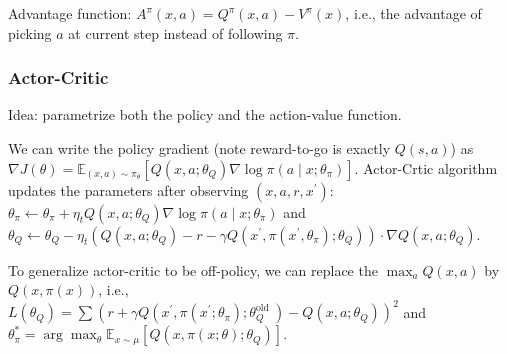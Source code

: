  Advantage function: $A^{\pi}(x, a)=Q^{\pi}(x, a)-V^{\pi}(x)$, i.e., the advantage of picking $a$ at current step instead of following $\pi$.

 \subsubsection*{Actor-Critic}

Idea: parametrize both the policy and the action-value function.

We can write the policy gradient (note reward-to-go is exactly $Q(s,a)$) as $\nabla J(\theta)=\mathbb{E}_{(x, a) \sim \pi_{\theta}}[Q(x, a; \theta_Q) \nabla \log \pi(a \mid x ; \theta_\pi)]$. Actor-Crtic algorithm updates the parameters after observing $(x,a,r,x^\prime)$: $\theta_{\pi} \leftarrow \theta_{\pi}+\eta_{t} Q\left(x, a ; \theta_{Q}\right) \nabla \log \pi\left(a \mid x ; \theta_{\pi}\right)$ and
$\theta_{Q} \leftarrow \theta_{Q}-\eta_{t}\left(Q\left(x, a ; \theta_{Q}\right)-r-\gamma Q\left(x^{\prime}, \pi\left(x^{\prime}, \theta_{\pi}\right) ; \theta_{Q}\right)\right) \cdot \nabla Q(x, a ; \theta_{Q})$.

To generalize actor-critic to be off-policy, we can replace the $\max_a Q(x,a)$ by $Q(x, \pi(x))$, i.e., $L\left(\theta_{Q}\right)=\sum \left(r+\gamma Q\left(x^{\prime}, \pi\left(x^{\prime} ; \theta_{\pi}\right) ; \theta_{Q}^{\text {old }}\right)-Q\left(x, a ; \theta_{Q}\right)\right)^{2}$ and $\theta_{\pi}^{*} = \arg \max _{\theta} \mathbb{E}_{x \sim \mu}\left[Q\left(x, \pi(x ; \theta) ; \theta_{Q}\right)\right]$.